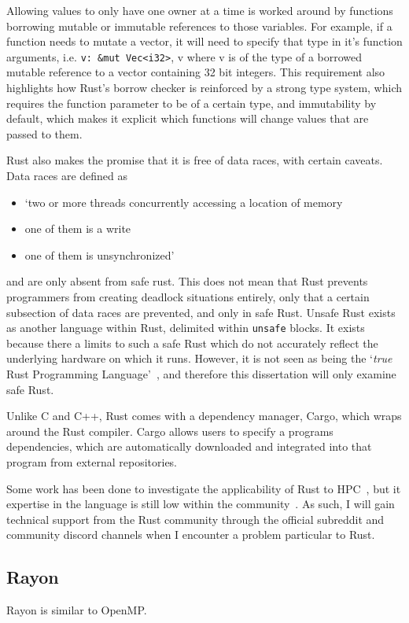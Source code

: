 Allowing values to only have one owner at a time is worked around by functions borrowing mutable or immutable references to those variables. For example, if a function needs to mutate a vector, it will need to specify that type in it's function arguments, i.e. \texttt{v: \&mut Vec<i32>}, v where v is of the type of a borrowed mutable reference to a vector containing 32 bit integers.
This requirement also highlights how Rust's borrow checker is reinforced by a strong type system, which requires the function parameter to be of a certain type, and immutability by default, which makes it explicit which functions will change values that are passed to them.

Rust also makes the promise that it is free of data races, with certain caveats. Data races are defined as 
\begin{itemize}
    \item `two or more threads concurrently accessing a location of memory
    \item one of them is a write
    \item one of them is unsynchronized'~\cite{NomRace}
\end{itemize}

and are only absent from safe rust. This does not mean that Rust prevents programmers from creating deadlock situations entirely, only that a certain subsection of data races are prevented, and only in safe Rust. Unsafe Rust exists as another language within Rust, delimited within \texttt{unsafe} blocks. It exists because there a limits to such a safe Rust which do not accurately reflect the underlying hardware on which it runs. However, it is not seen as being the `\textit{true} Rust Programming Language'~\cite{NomSafe}, and therefore this dissertation will only examine safe Rust.

Unlike C and C++, Rust comes with a dependency manager, Cargo, which wraps around the Rust compiler. Cargo allows users to specify a programs dependencies, which are automatically downloaded and integrated into that program from external repositories.

Some work has been done to investigate the applicability of Rust to HPC~, but it expertise in the language is still low within the community~. As such, I will gain technical support from the Rust community through the official subreddit and community discord channels when I encounter a problem particular to Rust.

\subsection{Rayon}
Rayon is similar to OpenMP\@.

